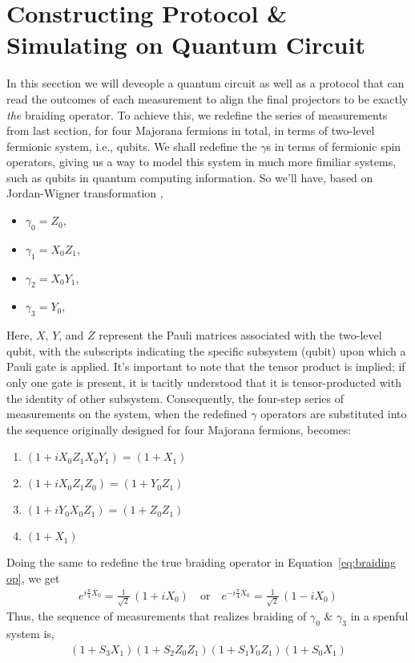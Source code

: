 \documentclass{article}
\begin{document}
\section{Constructing Protocol \& Simulating on Quantum Circuit} %
\label{sec:Constructing Protocol}
In this secction we will deveople a quantum circuit as well as a protocol that can read the outcomes of each measurement to align the final projectors to be exactly \textit{the} braiding operator. To achieve this, we redefine the series of measurements from last section, for four Majorana fermions in total, in terms of two-level fermionic system, i.e., qubits. We shall redefine the $ \gamma $s in terms of fermionic spin operators, giving us a way to model this system in much more fimiliar systems, such as qubits in quantum computing information. So we'll have, based on Jordan-Wigner transformation \cite{Backens_2017},
\begin{itemize}
	\item $ \gamma_0 = Z_0 $,
	\item $ \gamma_1 = X_0 Z_1 $,
	\item $ \gamma_2 = X_0 Y_1 $,
	\item $ \gamma_3 = Y_0 $,
\end{itemize}
Here, \(X\), \(Y\), and \(Z\) represent the Pauli matrices associated with the two-level qubit, with the subscripts indicating the specific subsystem (qubit) upon which a Pauli gate is applied. It's important to note that the tensor product is implied; if only one gate is present, it is tacitly understood that it is tensor-producted with the identity of other subsystem. Consequently, the four-step series of measurements on the system, when the redefined \( \gamma \) operators are substituted into the sequence originally designed for four Majorana fermions, becomes:
\begin{enumerate}
	\item $ (1 + i X_0 Z_1 X_0 Y_1) = (1 + X_1) $
	\item $ (1 + i X_0 Z_1 Z_0) = (1 + Y_0 Z_1) $
	\item $ (1 + i Y_0 X_0 Z_1) = (1 + Z_0 Z_1) $
	\item $ (1 + X_1) $
\end{enumerate}
Doing the same to redefine the true braiding operator in Equation~\ref{eq:braiding op}, we get
$$
	\begin{aligned}
		e^{i \frac{\pi}{4} X_0} = \frac{1}{\sqrt{2}}\, (1 + i X_0 ) \quad \text{or} \quad
		e^{-i \frac{\pi}{4} X_0} = \frac{1}{\sqrt{2}}\, (1 - i X_0 )
		\label{eq:br Jordan-Wigner}
	\end{aligned}
$$
Thus, the sequence of measurements that realizes braiding of $ \gamma_0 $ \& $ \gamma_3 $ in a spenful system is,
\begin{equation}
	\begin{aligned}
		(1 +S_3 X_1) (1 +S_2 Z_0 Z_1) (1 +S_1 Y_0 Z_1) (1 +S_0 X_1)
		\label{eq:fermionic meas seq}
	\end{aligned}
\end{equation}
\end{document}
